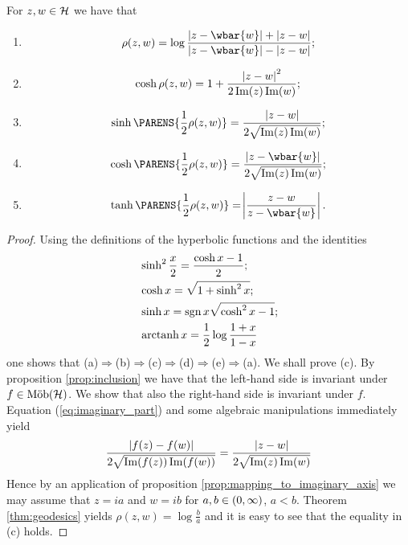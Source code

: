 \begin{theorem}
	For $z,w \in \mathcal{H}$ we have that
	\begin{enumerate}[label = \textup{(}\alph*\textup{)}]
		\item 
			\begin{equation}
				\rho(z,w) = \log \frac{\abs[0]{z - \wbar{w}} + \abs[0]{z - w}}{\abs[0]{z - \wbar{w}} - \abs[0]{z - w}};
			\end{equation}
		\item
			\begin{equation}
				\cosh \rho(z,w) = 1 + \frac{\abs[0]{z - w}^2}{2 \Im(z)\Im(w)};
			\end{equation}
		\item
			\begin{equation}
				\sinh \PARENS{\frac{1}{2}\rho(z,w)} = \frac{\abs[0]{z - w}}{2\sqrt{\Im(z)\Im(w)}};
			\end{equation}
		\item
			\begin{equation}
				\cosh \PARENS{\frac{1}{2}\rho(z,w)} = \frac{\abs[0]{z - \wbar{w}}}{2\sqrt{\Im(z)\Im(w)}};
			\end{equation}
		\item
			\begin{equation}
				\tanh \PARENS{\frac{1}{2}\rho(z,w)} = \abs[3]{\frac{z - w}{z - \wbar{w}}}.
			\end{equation}
	\end{enumerate}
	\label{thm:formulas}
\end{theorem}

\begin{proof}
	Using the definitions of the hyperbolic functions and the identities
	\begin{align*}
		& \sinh^2 \frac{x}{2} = \frac{\cosh x - 1}{2};\\
		& \cosh x = \sqrt{1 + \sinh^2 x};\\
		& \sinh x = \operatorname{sgn} x \sqrt{\cosh^2 x - 1};\\
		& \operatorname{arctanh} x = \frac{1}{2} \log \frac{1 + x}{1 - x}
	\end{align*}
	\noindent one shows that (a)$\Rightarrow$(b)$\Rightarrow$(c)$\Rightarrow$(d)$\Rightarrow$(e)$\Rightarrow$(a). We shall prove (c). By proposition \ref{prop:inclusion} we have that the left-hand side is invariant under $f \in \mathrm{M\ddot{o}b}(\mathcal{H})$. We show that also the right-hand side is invariant under $f$. Equation (\ref{eq:imaginary_part}) and some algebraic manipulations immediately yield
	\begin{equation*}
		\frac{\abs[0]{f(z) - f(w)}}{2\sqrt{\Im(f(z))\Im(f(w))}} = \frac{\abs[0]{z - w}}{2\sqrt{\Im(z)\Im(w)}}
	\end{equation*}
	Hence by an application of proposition \ref{prop:mapping_to_imaginary_axis} we may assume that $z = ia$ and $w = ib$ for $a,b \in \intoo{0,\infty}$, $a < b$. Theorem \ref{thm:geodesics} yields $\rho(z,w) = \log \frac{b}{a}$ and it is easy to see that the equality in (c) holds.
\end{proof}

